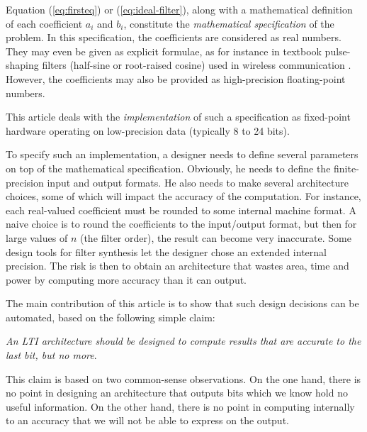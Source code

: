 \documentclass[twocolumn]{IEEEtran}
\begin{document}
Equation (\ref{eq:firsteq}) or (\ref{eq:ideal-filter}), along with a mathematical definition of each coefficient $a_i$ and $b_i$, constitute the \emph{mathematical specification} of the problem.
In this specification, the coefficients are considered as real numbers. 
They may even be given as explicit formulae, as for instance in textbook pulse-shaping filters (half-sine or root-raised cosine) used in wireless communication \cite{ZigBeeStandard}. 
However, the coefficients may also be provided as high-precision floating-point numbers.


This article deals with the \emph{implementation} of such a specification as fixed-point hardware operating on low-precision data (typically 8 to 24 bits).

To specify such an {implementation}, a designer needs to define several parameters on top of the mathematical specification.
Obviously, he needs to define the finite-precision input and output formats. 
He also needs to make several architecture choices, some of which will impact the accuracy of the computation. 
For instance, each real-valued coefficient must be rounded to some internal machine format.
A naive choice is to round the coefficients to the input/output format, but then for large values of $n$ (the filter order), the result can become very inaccurate.
Some design tools for filter synthesis let the designer chose an extended internal precision. 
The risk is then to obtain an architecture that wastes area, time and power by computing more accuracy than it can output.

The main contribution of this article is to show that such design decisions can be automated,  based on  the following simple claim:

\emph{An LTI architecture should be designed to compute results that are accurate to the last bit, but no more}.

This claim is based on two common-sense observations.
On the one hand, there is no point in designing an architecture that outputs  bits which we know hold no useful information. 
On the other hand, there is no point in computing internally to an accuracy that we will not be able to express on the output.
\end{document}
